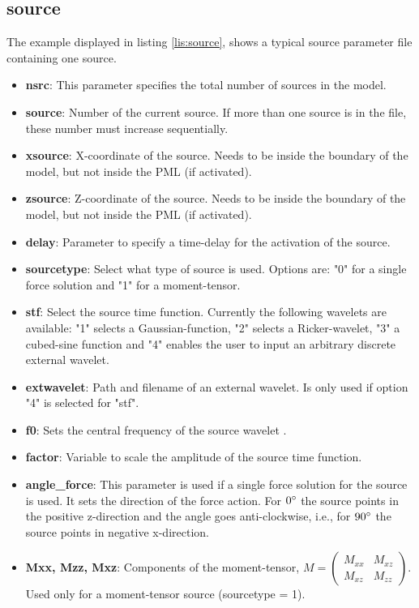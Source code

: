     \subsection{source}
    \label{subsec:source}
    	The example displayed in listing \ref{lis:source}, shows a typical source parameter file containing one source. 
     
    	\begin{itemize}
    		\item \textbf{nsrc}: This parameter specifies the total number of sources in the model.
    		\item \textbf{source}: Number of the current source. If more than one source is in the file, these number must increase sequentially.
    		\item \textbf{xsource}: X-coordinate of the source. Needs to be inside the boundary of the model, but not inside the PML (if activated).
    		\item \textbf{zsource}: Z-coordinate of the source. Needs to be inside the boundary of the model, but not inside the PML (if activated).
    		\item \textbf{delay}: Parameter to specify a time-delay for the activation of the source.
    		\item \textbf{sourcetype}: Select what type of source is used. Options are: "0" for a single force solution and "1" for a moment-tensor.
    		\item \textbf{stf}: Select the source time function. Currently the following wavelets are available: "1" selects a Gaussian-function, "2" selects a Ricker-wavelet, "3" a cubed-sine function and "4" enables the user to input an arbitrary discrete external wavelet.
    		\item \textbf{extwavelet}: Path and filename of an external wavelet. Is only used if option "4" is selected for "stf".
    		\item \textbf{f0}: Sets the central frequency of the source wavelet .
    		\item \textbf{factor}: Variable to scale the amplitude of the source time function.
    		\item \textbf{angle\_force}: This parameter is used if a single force solution for the source is used. It sets the direction of the force action. For $0\degree$ the source points in the positive z-direction and the angle goes anti-clockwise, i.e., for $90\degree$ the source points in negative x-direction.
    		\item \textbf{Mxx, Mzz, Mxz}: Components of the moment-tensor, $M=\left(\begin{smallmatrix} M_{xx} & M_{xz} \\ M_{xz} & M_{zz} \end{smallmatrix}\right)$. Used only for a moment-tensor source (sourcetype = 1).
    	\end{itemize}
    	
